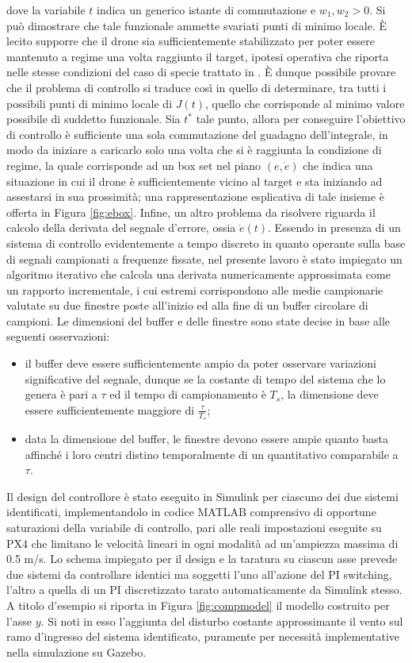 dove la variabile $t$ indica un generico istante di commutazione e $w_1, w_2 > 0$. Si può dimostrare che tale funzionale ammette svariati punti di minimo locale. È lecito supporre che il drone sia sufficientemente stabilizzato per poter essere mantenuto a regime una volta raggiunto il target, ipotesi operativa che riporta nelle stesse condizioni del caso di specie trattato in \cite{pisw}. È dunque possibile provare che il problema di controllo si traduce così in quello di determinare, tra tutti i possibili punti di minimo locale di $J(t)$, quello che corrisponde al minimo valore possibile di suddetto funzionale. Sia $t^*$ tale punto, allora per conseguire l'obiettivo di controllo è sufficiente una sola commutazione del guadagno dell'integrale, in modo da iniziare a caricarlo solo una volta che si è raggiunta la condizione di regime, la quale corrisponde ad un box set nel piano $(e, \dot{e})$ che indica una situazione in cui il drone è sufficientemente vicino al target e sta iniziando ad assestarsi in sua prossimità; una rappresentazione esplicativa di tale insieme è offerta in Figura \ref{fig:ebox}. Infine, un altro problema da risolvere riguarda il calcolo della derivata del segnale d'errore, ossia $\dot{e}(t)$. Essendo in presenza di un sistema di controllo evidentemente a tempo discreto in quanto operante sulla base di segnali campionati a frequenze fissate, nel presente lavoro è stato impiegato un algoritmo iterativo che calcola una derivata numericamente approssimata come un rapporto incrementale, i cui estremi corrispondono alle medie campionarie valutate su due finestre poste all'inizio ed alla fine di un buffer circolare di campioni. Le dimensioni del buffer e delle finestre sono state decise in base alle seguenti osservazioni:
\begin{itemize}
    \item il buffer deve essere sufficientemente ampio da poter osservare variazioni significative del segnale, dunque se la costante di tempo del sistema che lo genera è pari a $\tau$ ed il tempo di campionamento è $T_s$, la dimensione deve essere sufficientemente maggiore di $\frac{\tau}{T_s}$;
    \item data la dimensione del buffer, le finestre devono essere ampie quanto basta affinché i loro centri distino temporalmente di un quantitativo comparabile a $\tau$.
\end{itemize}
Il design del controllore è stato eseguito in Simulink per ciascuno dei due sistemi identificati, implementandolo in codice MATLAB comprensivo di opportune saturazioni della variabile di controllo, pari alle reali impostazioni eseguite su PX4 che limitano le velocità lineari in ogni modalità ad un'ampiezza massima di 0.5 m/s. Lo schema impiegato per il design e la taratura su ciascun asse prevede due sistemi da controllare identici ma soggetti l'uno all'azione del PI switching, l'altro a quella di un PI discretizzato tarato automaticamente da Simulink stesso. A titolo d'esempio si riporta in Figura \ref{fig:compmodel} il modello costruito per l'asse $y$. Si noti in esso l'aggiunta del disturbo costante approssimante il vento sul ramo d'ingresso del sistema identificato, puramente per necessità implementative nella simulazione su Gazebo.\\
